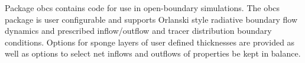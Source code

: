 Package obcs contains code for use in open-boundary simulations.
The obcs package is user configurable and supports
Orlanski style radiative boundary flow dynamics and prescribed
inflow/outflow and tracer distribution boundary conditions. Options for
sponge layers of user defined thicknesses are provided as well as options to 
select net inflows and outflows of properties be kept in
balance.

